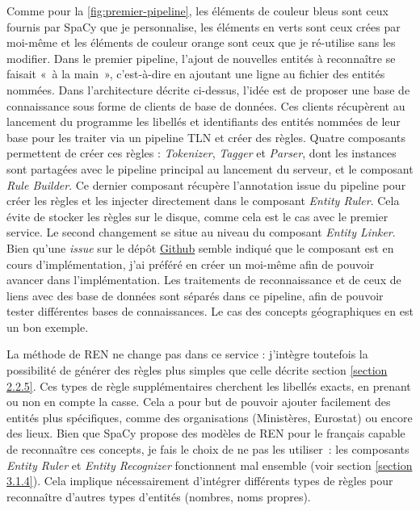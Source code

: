 Comme pour la \autoref{fig:premier-pipeline}, les éléments de couleur bleus sont ceux fournis par SpaCy que je personnalise, les éléments en verts sont ceux crées par moi-même et les éléments de couleur orange sont ceux que je ré-utilise sans les modifier. Dans le premier pipeline, l'ajout de nouvelles entités à reconnaître se faisait «~à la main~», c'est-à-dire en ajoutant une ligne au fichier des entités nommées. Dans l'architecture décrite ci-dessus, l'idée est de proposer une base de connaissance sous forme de clients de base de données. Ces clients récupèrent au lancement du programme les libellés et identifiants des entités nommées de leur base pour les traiter via un pipeline TLN et créer des règles. Quatre composants permettent de créer ces règles : \textit{Tokenizer}, \textit{Tagger} et \textit{Parser}, dont les instances sont partagées avec le pipeline principal au lancement du serveur, et le composant \textit{Rule Builder}. Ce dernier composant récupère l'annotation issue du pipeline pour créer les règles et les injecter directement dans le composant \textit{Entity Ruler}. Cela évite de stocker les règles sur le disque, comme cela est le cas avec le premier service.
Le second changement se situe au niveau du composant \textit{Entity Linker}. Bien qu'une \textit{issue} sur le dépôt \href{https://github.com/explosion/spaCy/issues}{Github} \cite{spacy-repo} semble indiqué que le composant est en cours d'implémentation, j'ai préféré en créer un moi-même afin de pouvoir avancer dans l'implémentation. Les traitements de reconnaissance et de ceux de liens avec des base de données sont séparés dans ce pipeline, afin de pouvoir tester différentes bases de connaissances. Le cas des concepts géographiques en est un bon exemple.
\newline

La méthode de REN ne change pas dans ce service : j'intègre toutefois la possibilité de générer des règles plus simples que celle décrite section \ref{section 2.2.5}. Ces types de règle supplémentaires cherchent les libellés exacts, en prenant ou non en compte la casse. Cela a pour but de pouvoir ajouter facilement des entités plus spécifiques, comme des organisations (Ministères, Eurostat) ou encore des lieux. Bien que SpaCy propose des modèles de REN pour le français capable de reconnaître ces concepts, je fais le choix de ne pas les utiliser~: les composants \textit{Entity Ruler} et \textit{Entity Recognizer} fonctionnent mal ensemble (voir section \ref{section 3.1.4}). Cela implique nécessairement d'intégrer différents types de règles pour reconnaître d'autres types d'entités (nombres, noms propres). 
\newline

